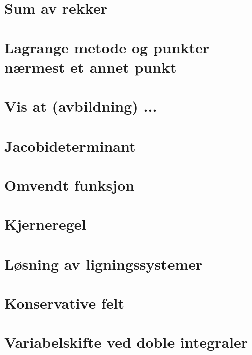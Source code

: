 \documentclass{article}
\begin{document}
  \section*{Sum av rekker}
    
  \section*{Lagrange metode og punkter nærmest et annet punkt}
    
  \section*{Vis at (avbildning) ...}
    
  \section*{Jacobideterminant}
    
  \section*{Omvendt funksjon}
    
  \section*{Kjerneregel}
    
  \section*{Løsning av ligningssystemer}
    
  \section*{Konservative felt}
    
  \section*{Variabelskifte ved doble integraler}
    
\end{document}
